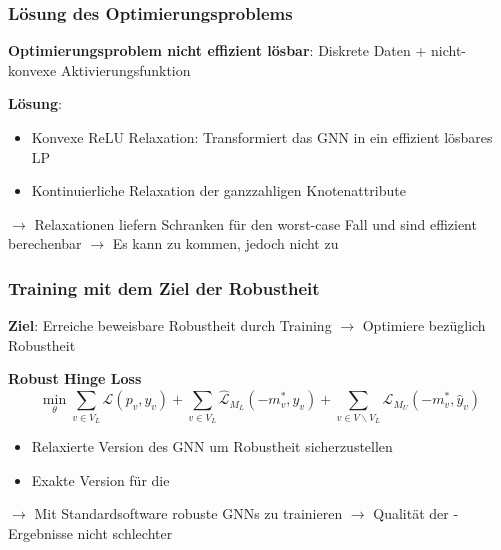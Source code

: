\documentclass{beamer}
\begin{document}
\begin{frame}
  \frametitle{Lösung des Optimierungsproblems}
  \textbf{Optimierungsproblem nicht effizient lösbar}:\newline 
  Diskrete Daten + nicht-konvexe Aktivierungsfunktion\newline

  \textbf{Lösung}:
  \begin{itemize}
    \item Konvexe ReLU Relaxation: Transformiert das GNN in ein effizient lösbares LP
    \item Kontinuierliche Relaxation der ganzzahligen Knotenattribute
  \end{itemize}

  $\rightarrow$ Relaxationen liefern Schranken für den worst-case Fall und sind effizient berechenbar\newline
  $\rightarrow$ Es kann zu  kommen, jedoch nicht zu 
\end{frame}

\begin{frame}
  \frametitle{Training mit dem Ziel der Robustheit}

  \textbf{Ziel}: Erreiche beweisbare Robustheit durch Training\newline
  $\rightarrow$ Optimiere bezüglich Robustheit

  \textbf{Robust Hinge Loss}
  \[
  \min_{\theta} \sum_{v \in V_L} \mathcal{L}(p_v, y_v) + \sum_{v \in V_L} \mathcal{\hat{L}}_{M_L} (-m^{\ast}_v, y_v)
  + \sum_{v \in V \backslash V_L} \mathcal{\hat{L}}_{M_U} (-m^{\ast}_v, \hat{y}_v)
  \]

  \begin{itemize}
    \item Relaxierte Version des GNN um Robustheit sicherzustellen
    \item Exakte Version für die 
  \end{itemize}  

  $\rightarrow$ Mit Standardsoftware robuste GNNs zu trainieren\newline
  $\rightarrow$ Qualität der -Ergebnisse nicht schlechter
\end{frame}
\end{document}
